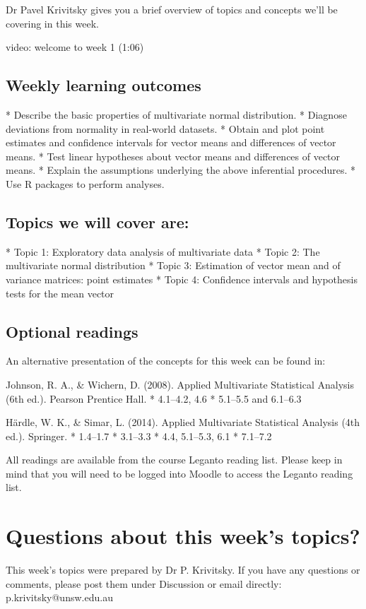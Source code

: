 \documentclass[11pt]{article}
\begin{document}
Dr Pavel Krivitsky gives you a brief overview of topics and concepts we'll be
covering in this week.

video: welcome to week 1 (1:06)

\subsection{Weekly learning outcomes}\label{subsec:weekly-learning-outcomes}
* Describe the basic properties of multivariate normal distribution.
* Diagnose deviations from normality in real-world datasets.
* Obtain and plot point estimates and confidence intervals for vector means and
differences of vector means.
* Test linear hypotheses about vector means and differences of vector means.
* Explain the assumptions underlying the above inferential procedures.
* Use R packages to perform analyses.

\subsection{Topics we will cover are:}\label{subsec:topics-we-will-cover-are:}
* Topic 1: Exploratory data analysis of multivariate data
* Topic 2: The multivariate normal distribution
* Topic 3: Estimation of vector mean and of variance matrices: point estimates
* Topic 4: Confidence intervals and hypothesis tests for the mean vector

\subsection{Optional readings}\label{subsec:optional-readings}
An alternative presentation of the concepts for this week can be found in:

Johnson, R. A., \& Wichern, D. (2008). Applied Multivariate Statistical Analysis
(6th ed.). Pearson Prentice Hall.
* 4.1–4.2, 4.6
* 5.1–5.5 and 6.1–6.3

Härdle, W. K., \& Simar, L. (2014). Applied Multivariate Statistical Analysis
(4th ed.). Springer.
* 1.4–1.7
* 3.1–3.3
* 4.4, 5.1–5.3, 6.1
* 7.1–7.2

All readings are available from the course Leganto reading list. Please keep in
mind that you will need to be logged into Moodle to access the Leganto reading
list.

\section{Questions about this week's topics?}\label{sec:questions-about-this-week's-topics?}
This week's topics were prepared by Dr P. Krivitsky.
If you have any questions or comments, please post them under Discussion or
email directly:
p.krivitsky@unsw.edu.au
\end{document}
